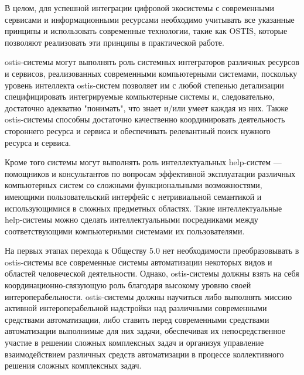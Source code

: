 В целом, для успешной интеграции цифровой экосистемы с современными сервисами и информационными ресурсами необходимо учитывать все указанные принципы и использовать современные технологии, такие как OSTIS, которые позволяют реализовать эти принципы в практической работе.

ostis-системы могут выполнять роль системных интеграторов различных ресурсов и сервисов, реализованных современными компьютерными системами, поскольку уровень интеллекта ostis-систем позволяет им с любой степенью детализации специфицировать интегрируемые компьютерные системы и, следовательно, достаточно адекватно "понимать", что знает и/или умеет каждая из них. Также ostis-системы способны достаточно качественно координировать деятельность стороннего ресурса и сервиса и обеспечивать релевантный поиск нужного ресурса и сервиса.

Кроме того системы могут выполнять роль интеллектуальных help-систем --- помощников и консультантов по вопросам эффективной эксплуатации различных компьютерных систем со сложными функциональными возможностями, имеющими пользовательский интерфейс с нетривиальной семантикой и использующимися в сложных предметных областях. 
Такие интеллектуальные help-системы можно сделать интеллектуальными посредниками между соответствующими компьютерными системами их пользователями.

На первых этапах перехода к Обществу 5.0 нет необходимости преобразовывать в ostis-системы все современные системы автоматизации некоторых видов и областей человеческой деятельности. 
Однако, ostis-системы должны взять на себя координационно-связующую роль благодаря высокому уровню своей интероперабельности. 
ostis-системы должны научиться либо выполнять миссию активной интероперабельной надстройки над различными современными средствами автоматизации, либо ставить перед современными средствами автоматизации выполнимые для них задачи, обеспечивая их непосредственное участие в решении сложных комплексных задач и организуя управление взаимодействием различных средств автоматизации в процессе коллективного решения сложных комплексных задач.
